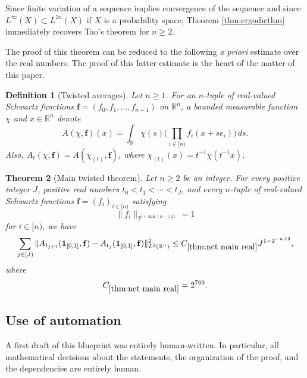 \documentclass[12pt,reqno]{amsart}
\theoremstyle{plain}
\newtheorem{theorem}{Theorem}[section]
\newtheorem{definition}[theorem]{Definition}
\numberwithin{equation}{section}
\theoremstyle{remark}
\newcommand{\using}[1]{}
\newcommand{\R}{{\mathbb R}}
\newcommand{\jr}[1]{{\color{orange}{[J: #1]}}}
\begin{document}
Since finite variation of a sequence implies convergence of the sequence and since $L^\infty(X)\subset L^{2n}(X)$ if $X$ is a probability space, Theorem \ref{thm:ergodicthm} immediately recovers Tao's theorem  \cite[Theorem 1.1]{Tao07} for $n\ge 2$.


The proof of this theorem can be reduced to the following {\em a priori} estimate over the real numbers. The proof of this latter estimate is the heart of the matter of this paper.

\begin{definition}[Twisted averages]
Let $n\geq 1$. For an $n$-tuple of real-valued Schwartz functions $\mathbf f = (f_0,f_1,\dots,f_{n-1})$ on $\R^n$, a bounded measurable function $\chi$ and $x\in\mathbb{R}^n$ denote
\begin{equation}\label{A_def}
A(\chi,\mathbf f)(x) = \int_{\mathbb{R}} \chi(s)\Big(\prod_{i\in [n)} f_i(x+se_i)\Big)\,ds.
\end{equation}
Also, $A_t(\chi,\mathbf{f})=A(\chi_{(t)},\mathbf{f})$, where $\chi_{(t)}(x)=t^{-1}\chi(t^{-1}x)$.
\end{definition}

\begin{theorem}[Main twisted theorem]\label{thm:nct main real}\jr{GPT: this theorem is lacking \using{..} annotations, add them. Also make sure every theorem in the document has these annotations. To be clear, we only annotate the theorems that are directly used in the proof, we do not add indirect dependencies through theorems that are used.}
Let $n\ge 2$ be an integer. For every positive integer $J$, positive real numbers $t_0<t_1<\cdots<t_J$, and every $n$-tuple of real-valued Schwartz functions ${\mathbf f}=(f_i)_{i\in[n)}$ satisfying
\begin{equation}\label{main twisted normalization}
\|f_i\|_{2^{i+\min(n-i,2)}}=1
\end{equation}
for $i\in[n)$, we have
\begin{equation}\label{e:ncommuting_real}
\sum_{j\in[J)}\|A_{t_{j+1}}(\mathbf 1_{[0,1]},\mathbf f)-A_{t_j}(\mathbf 1_{[0,1]},\mathbf f)\|_{L^2(\R^n)}^2
\le C_{\ref{thm:nct main real}}J^{1-2^{-n+2}},
\end{equation}
where
\begin{equation}\label{main twisted theorem constant}
C_{\ref{thm:nct main real}}=2^{769}.
\end{equation}
\end{theorem}

\subsection{Use of automation}\label{sec:comments-on-automation}
A first draft of this blueprint was entirely human-written.
In particular, all mathematical decisions about the statements, the organization of the proof, and the dependencies are entirely human.
\end{document}
